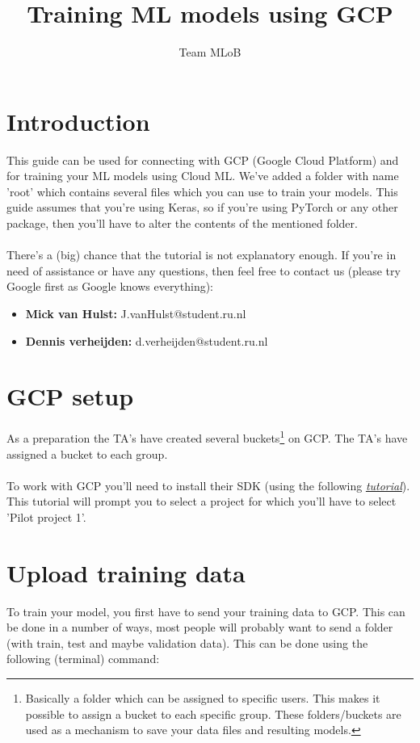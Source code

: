 \documentclass{article}
\title{}
\title{Training ML models using GCP}
\author{Team MLoB}
\begin{document}
\maketitle

\section{Introduction}
This guide can be used for connecting with GCP (Google Cloud Platform) and for training your ML models using Cloud ML. We've added a folder with name 'root' which contains several files which you can use to train your models. This guide assumes that you're using Keras, so if you're using PyTorch or any other package, then you'll have to alter the contents of the mentioned folder.
\\
\\
There's a (big) chance that the tutorial is not explanatory enough. If you're in need of assistance or have any questions, then feel free to contact us (please try Google first as Google knows everything):
\begin{itemize}
	\item \textbf{Mick van Hulst:} J.vanHulst@student.ru.nl 
	\item \textbf{Dennis verheijden:} d.verheijden@student.ru.nl
\end{itemize}

\section{GCP setup}
As a preparation the TA's have created several buckets\footnote{Basically a folder which can be assigned to specific users. This makes it possible to assign a bucket to each specific group. These folders/buckets are used as a mechanism to save your data files and resulting models.} on GCP. The TA's have assigned a bucket to each group.
\\
\\
To work with GCP you'll need to install their SDK (using the following \textit{\href{https://cloud.google.com/sdk/docs/}{tutorial}}). This tutorial will prompt you to select a project for which you'll have to select 'Pilot project 1'.

\section{Upload training data}
To train your model, you first have to send your training data to GCP. This can be done in a number of ways, most people will probably want to send a folder (with train, test and maybe validation data). This can be done using the following (terminal) command:
\end{document}
